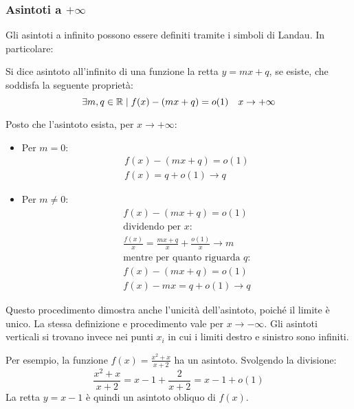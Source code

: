\subsubsection{Asintoti a $+\infty$}
Gli asintoti a infinito possono essere definiti tramite i simboli di Landau. In particolare:
\begin{defin}
	Si dice asintoto all'infinito di una funzione la retta $y=mx+q$, se esiste, che soddisfa la seguente proprietà:
	\[
		\exists m,q\in\mathbb{R}\mid f(x)-(mx+q)=o(1)\quad x\to +\infty
	\]
\end{defin}
Posto che l'asintoto esista, per $x\to+\infty$:
\begin{itemize}
	\item Per $m=0$:
	      \begin{gather*}
		      f(x)-(mx+q)=o(1)\\
		      f(x)=q+o(1)\to q
	      \end{gather*}
	\item Per $m\neq0$:
	      \begin{gather*}
		      f(x)-(mx+q)=o(1)\\
		      \text{dividendo per $x$:}\\
		      \frac{f(x)}{x}=\frac{mx+q}{x}+\frac{o(1)}{x}\to m\\
		      \text{mentre per quanto riguarda $q$:}\\
		      f(x)-(mx+q)=o(1)\\
		      f(x)-mx=q+o(1)\to q
	      \end{gather*}
\end{itemize}
Questo procedimento dimostra anche l'unicità dell'asintoto, poiché il limite è unico. La stessa definizione e procedimento vale per $x\to-\infty$. Gli asintoti verticali si trovano invece nei punti $x_i$ in cui i limiti destro e sinistro sono infiniti.
\begin{examp}
	Per esempio, la funzione $f(x)=\frac{x^2+x}{x+2}$ ha un asintoto. Svolgendo la divisione:
	\[
		\frac{x^2+x}{x+2}=x-1+\frac{2}{x+2}=x-1+o(1)
	\]
	La retta $y=x-1$ è quindi un asintoto obliquo di $f(x)$.
\end{examp}

